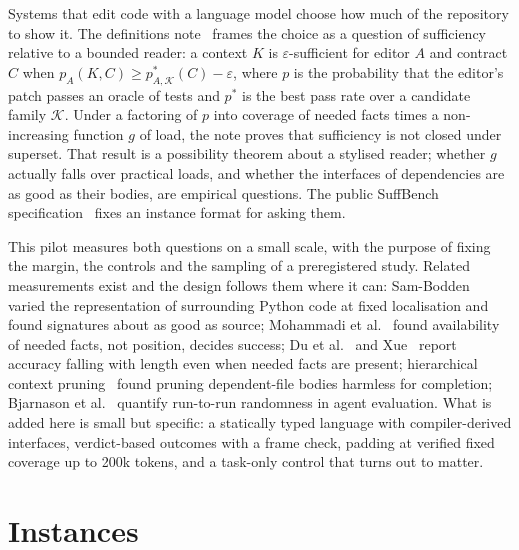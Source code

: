 \documentclass[10pt]{article}
\newcommand{\eps}{\varepsilon}
\begin{document}
Systems that edit code with a language model choose how much of the repository to show it. The definitions note~\cite{johansen2026note} frames the choice as a question of sufficiency relative to a bounded reader: a context $K$ is $\eps$-sufficient for editor $A$ and contract $C$ when $p_A(K,C) \ge p^*_{A,\mathcal K}(C) - \eps$, where $p$ is the probability that the editor's patch passes an oracle of tests and $p^*$ is the best pass rate over a candidate family $\mathcal K$. Under a factoring of $p$ into coverage of needed facts times a non-increasing function $g$ of load, the note proves that sufficiency is not closed under superset. That result is a possibility theorem about a stylised reader; whether $g$ actually falls over practical loads, and whether the interfaces of dependencies are as good as their bodies, are empirical questions. The public SuffBench specification~\cite{suffbenchspec} fixes an instance format for asking them.

This pilot measures both questions on a small scale, with the purpose of fixing the margin, the controls and the sampling of a preregistered study. Related measurements exist and the design follows them where it can: Sam-Bodden~\cite{sambodden2026context} varied the representation of surrounding Python code at fixed localisation and found signatures about as good as source; Mohammadi et al.~\cite{mohammadi2026workingset} found availability of needed facts, not position, decides success; Du et al.~\cite{du2025length} and Xue~\cite{xue2026contextrot} report accuracy falling with length even when needed facts are present; hierarchical context pruning~\cite{zhang2024hcp} found pruning dependent-file bodies harmless for completion; Bjarnason et al.~\cite{bjarnason2026randomness} quantify run-to-run randomness in agent evaluation. What is added here is small but specific: a statically typed language with compiler-derived interfaces, verdict-based outcomes with a frame check, padding at verified fixed coverage up to 200k tokens, and a task-only control that turns out to matter.

\section{Instances}
\end{document}
